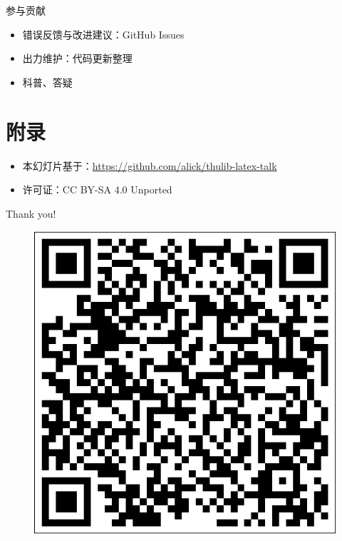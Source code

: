 \documentclass[xcolor=table,dvipsnames,svgnames]{beamer}
\begin{document}
\begin{frame}{参与贡献}
\begin{itemize}
\item 错误反馈与改进建议：GitHub Issues
\item 出力维护：代码更新整理
\item 科普、答疑
\end{itemize}
\end{frame}

\section*{附录}

\begin{frame}
  \begin{itemize}
    \item 本幻灯片基于：\url{https://github.com/alick/thulib-latex-talk}
    \item 许可证：CC BY-SA 4.0 Unported \cc\ccby\ccsa
  \end{itemize}
\end{frame}

\begin{frame}
  \begin{center}
    {\Huge\calligra Thank you!}
  \end{center}
  \begin{figure}[htbp]
    \centering
    \includegraphics[height=.3\textheight]{url.pdf}
  \end{figure}
\end{frame}
\end{document}
